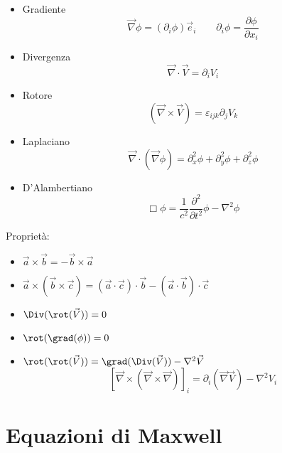 \begin{itemize}
    \item Gradiente
    \begin{equation*}
        \vec{\nabla}\phi = (\partial_i\phi)\vec{e}_i \qquad \partial_i\phi= \frac{\partial \phi}{\partial x_i}
    \end{equation*}
    \item Divergenza
    \begin{equation*}
        \vec{\nabla}\cdot\vec{V} = \partial_i V_i
    \end{equation*}
    \item Rotore 
    \begin{equation*}
        {(\vec{\nabla}\times \vec{V})} = \varepsilon_{ijk}\partial_j V_k
    \end{equation*}
    \item Laplaciano
    \begin{equation*}
        \vec{\nabla}\cdot (\vec{\nabla}\phi) = \partial^2_x \phi + \partial^2_y \phi + \partial^2_z \phi 
    \end{equation*}
    \item D'Alambertiano
    \begin{equation*}
        \Box\phi = \frac{1}{c^2}\frac{\partial^2}{\partial t^2}\phi -\nabla^2\phi 
    \end{equation*}
\end{itemize}
Proprietà:
\begin{itemize}
    \item $\vec{a} \times \vec{b} = -\vec{b} \times \vec{a}$
    \item $\vec{a} \times (\vec{b} \times \vec{c}) = (\vec{a} \cdot \vec{c})\cdot \vec{b} - (\vec{a}\cdot \vec{b})\cdot \vec{c}$
    \item $\Div(\rot(\vec{V})) =0$
    \item $\rot(\grad(\phi)) = 0$
    \item $\rot(\rot(\vec{V})) = \grad(\Div(\vec{V}))- \nabla^2\vec{V}$
    \begin{equation*}
        {[\vec{\nabla} \times (\vec{\nabla} \times \vec{\nabla})]}_i = \partial_i(\vec{\nabla}\vec{V})-\nabla^2V_i
    \end{equation*}
\end{itemize}

\section*{Equazioni di Maxwell}

